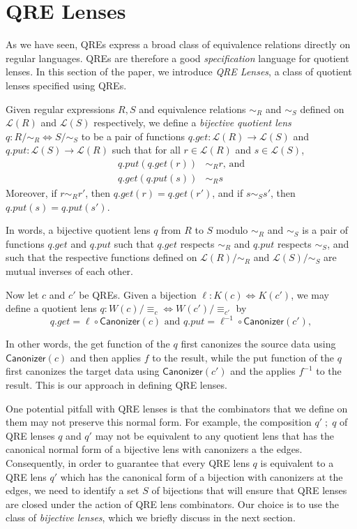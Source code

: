 \documentclass[acmsmall,review,anonymous]{acmart}
\newcommand{\kw}[1]{\ensuremath{\mathsf{#1}}}
\newcommand{\canonizer}{\ensuremath{\kw{Canonizer}}}
\newcommand{\eqrel}[1]{\ensuremath{\equiv_{#1}}}
\begin{document}
\section{QRE Lenses}
\label{QRE-lenses}
As we have seen, QREs express a broad class of equivalence relations
directly on regular languages.  QREs are therefore a good \textit{specification}
language for quotient lenses. In this section of the paper, we introduce
\textit{QRE Lenses}, a class of quotient lenses specified using QREs.

Given regular expressions $R, S$ and equivalence relations
$\sim_R$ and $\sim_S$ defined on $\mathcal{L}(R)$ and $\mathcal{L}(S)$
respectively, we define a {\em bijective quotient lens} $q : R /{\sim_R}
\Leftrightarrow S/{\sim_S}$ to be a pair of functions $q.get :
\mathcal{L}(R) \longrightarrow \mathcal{L}(S)$ and $q.put : \mathcal{L}(S)
\longrightarrow \mathcal{L}(R)$ such that for all $r \in \mathcal{L}(R)$ and $s
\in \mathcal{L}(S)$,
\begin{align*}
q.put(q.get(r)) &\sim_R r \text{, and}\\
q.get(q.put(s)) &\sim_R s
\end{align*}
Moreover, if $r \sim_R r'$, then $q.get(r) = q.get(r')$, and if $s \sim_S s'$,
then $q.put(s) = q.put(s')$.

In words, a bijective quotient lens $q$ from $R$ to $S$ modulo $\sim_R$
and $\sim_S$ is a pair of functions $q.get$ and $q.put$ such that $q.get$
respects $\sim_R$ and $q.put$ respects $\sim_S$, and such that the respective
functions defined on $\mathcal{L}(R)/{\sim_R}$ and $\mathcal{L}(S)/{\sim_S}$ are
mutual inverses of each other.

Now let $c$ and $c'$ be QREs. Given a bijection $\ell : K(c) \Leftrightarrow
K(c')$, we may define a quotient lens $q : W(c)/\eqrel{c} \Leftrightarrow
W(c')/\eqrel{c'}$ by
\begin{equation}\label{normalform}
q.get = \ell \circ \canonizer(c) \text{ and } q.put = \ell^{-1} \circ
\canonizer(c'),
\end{equation}

\noindent In other words, the get function of the $q$ first canonizes the source
data using $\canonizer(c)$ and then applies $f$ to the result, while the
put function of the $q$ first canonizes the target data using
$\canonizer(c')$ and the applies $f^{-1}$ to the result. This is our approach in
defining QRE lenses.

One potential pitfall with QRE lenses is that the combinators that
we define on them may not preserve this normal form. For example, the
composition $q' \; ; \; q$ of QRE lenses $q$ and $q'$ may not be equivalent to
any quotient lens that has the canonical normal form of a bijective lens with
canonizers a the edges. Consequently, in order to guarantee that every QRE
lens $q$ is equivalent to a QRE lens $q'$ which has the canonical form of
a bijection with canonizers at the edges, we need to identify a set $S$ of
bijections that will ensure that QRE lenses are closed under the action of QRE
lens combinators. Our choice is to use the class of \textit{bijective lenses},
which we briefly discuss in the next section.
\end{document}
